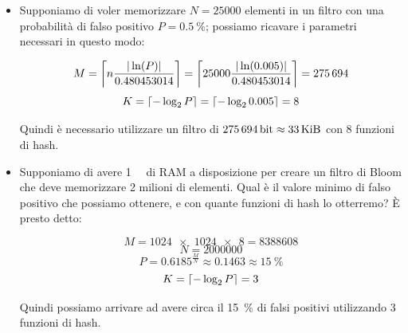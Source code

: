 \begin{itemize}
	\medskip

	\item Supponiamo di voler memorizzare $N=\num{25000}$ elementi in un filtro con una probabilità di
	falso positivo $P=\SI{0.5}{\percent}$; possiamo ricavare i parametri necessari in questo modo:

	$$ M = \ceil*{n\frac{|\ln(P)|}{0.480453014}} = \ceil*{25000\frac{|\ln(0.005)|}{0.480453014}} = \num{275694} $$
	$$ K = \ceil*{-\log_2{P}} = \ceil*{-\log_2{0.005}} = 8 $$

	Quindi è necessario utilizzare un filtro di $\SI{275694}{\bit} \approx \SI{33}{\kibi\byte}$ con 
	\num{8} funzioni di hash.

	\item Supponiamo di avere \SI{1}{\mebi\byte} di RAM a disposizione per creare un filtro di Bloom
	che deve memorizzare 2 milioni di elementi. Qual è il valore minimo di falso positivo che
	possiamo ottenere, e con quante funzioni di hash lo otterremo? È presto detto:

	$$ M = \num{1024 x 1024 x 8} = \num{8388608} $$
	$$ N = \num{2000000} $$
	$$ P = 0.6185 ^ \frac{M}{N} \approx 0.1463 \approx \SI{15}{\percent} $$
	$$ K = \ceil*{-\log_2{P}} = 3 $$

	Quindi possiamo arrivare ad avere circa il \SI{15}{\percent} di falsi positivi utilizzando
	\num{3} funzioni di hash.
\end{itemize}

